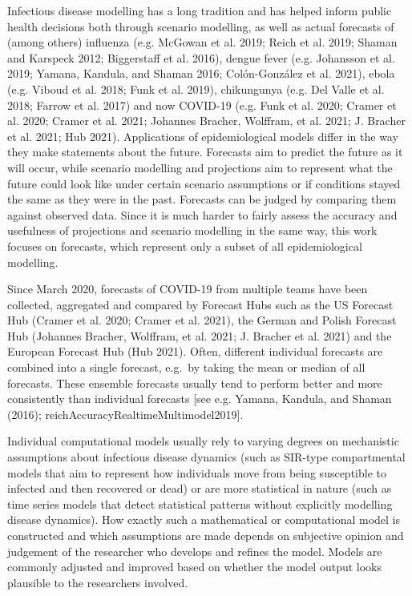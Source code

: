 \documentclass[
]{article}
\begin{document}
Infectious disease modelling has a long tradition and has helped inform public health decisions both through scenario modelling, as well as actual forecasts of (among others) influenza (e.g. McGowan et al. 2019; Reich et al. 2019; Shaman and Karspeck 2012; Biggerstaff et al. 2016), dengue fever (e.g. Johansson et al. 2019; Yamana, Kandula, and Shaman 2016; Colón-González et al. 2021), ebola (e.g. Viboud et al. 2018; Funk et al. 2019), chikungunya (e.g. Del Valle et al. 2018; Farrow et al. 2017) and now COVID-19 (e.g. Funk et al. 2020; Cramer et al. 2020; Cramer et al. 2021; Johannes Bracher, Wolffram, et al. 2021; J. Bracher et al. 2021; Hub 2021). Applications of epidemiological models differ in the way they make statements about the future. Forecasts aim to predict the future as it will occur, while scenario modelling and projections aim to represent what the future could look like under certain scenario assumptions or if conditions stayed the same as they were in the past. Forecasts can be judged by comparing them against observed data. Since it is much harder to fairly assess the accuracy and usefulness of projections and scenario modelling in the same way, this work focuses on forecasts, which represent only a subset of all epidemiological modelling.

Since March 2020, forecasts of COVID-19 from multiple teams have been collected, aggregated and compared by Forecast Hubs such as the US Forecast Hub (Cramer et al. 2020; Cramer et al. 2021), the German and Polish Forecast Hub (Johannes Bracher, Wolffram, et al. 2021; J. Bracher et al. 2021) and the European Forecast Hub (Hub 2021). Often, different individual forecasts are combined into a single forecast, e.g.~by taking the mean or median of all forecasts. These ensemble forecasts usually tend to perform better and more consistently than individual forecasts {[}see e.g. Yamana, Kandula, and Shaman (2016); reichAccuracyRealtimeMultimodel2019{]}.

Individual computational models usually rely to varying degrees on mechanistic assumptions about infectious disease dynamics (such as SIR-type compartmental models that aim to represent how individuals move from being susceptible to infected and then recovered or dead) or are more statistical in nature (such as time series models that detect statistical patterns without explicitly modelling disease dynamics). How exactly such a mathematical or computational model is constructed and which assumptions are made depends on subjective opinion and judgement of the researcher who develops and refines the model. Models are commonly adjusted and improved based on whether the model output looks plausible to the researchers involved.
\end{document}
